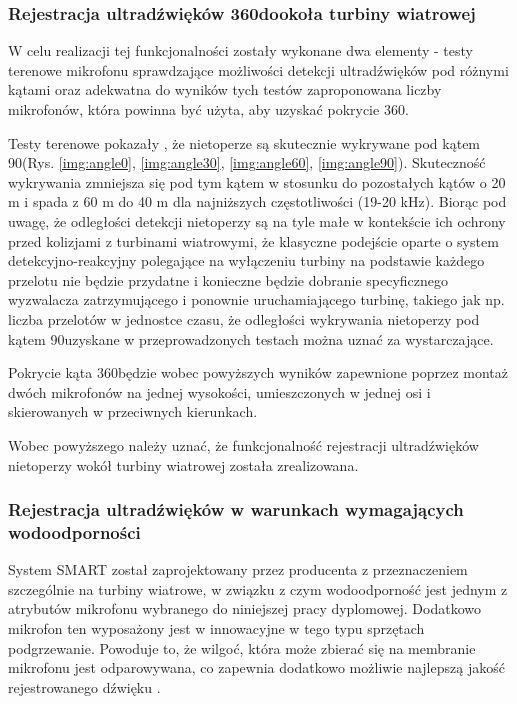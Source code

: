 \documentclass{sprz}
\begin{document}
\subsubsection{Rejestracja ultradźwięków 360\textdegree dookoła turbiny wiatrowej}
W celu realizacji tej funkcjonalności zostały wykonane dwa elementy - testy terenowe mikrofonu sprawdzające możliwości detekcji ultradźwięków pod różnymi kątami oraz adekwatna do wyników tych testów zaproponowana liczby mikrofonów, która powinna być użyta, aby uzyskać pokrycie 360\textdegree. 


Testy terenowe pokazały , że nietoperze są skutecznie wykrywane pod kątem 90\textdegree (Rys. \ref{img:angle0}, \ref{img:angle30}, \ref{img:angle60}, \ref{img:angle90}). Skuteczność wykrywania zmniejsza się pod tym kątem w stosunku do pozostałych kątów o 20 m i spada z 60 m do 40 m dla najniższych częstotliwości (19-20 kHz). Biorąc pod uwagę, że odległości detekcji nietoperzy są na tyle małe w kontekście ich ochrony przed kolizjami z turbinami wiatrowymi, że klasyczne podejście oparte o system detekcyjno-reakcyjny polegające
na wyłączeniu turbiny na podstawie każdego przelotu nie będzie przydatne i konieczne będzie dobranie specyficznego wyzwalacza zatrzymującego i ponownie uruchamiającego turbinę, takiego jak np. liczba przelotów w jednostce czasu, że odległości wykrywania nietoperzy pod kątem 90\textdegree uzyskane w przeprowadzonych testach można uznać za wystarczające. 

Pokrycie kąta 360\textdegree będzie wobec powyższych wyników zapewnione poprzez montaż dwóch mikrofonów na jednej wysokości, umieszczonych w jednej osi i skierowanych w przeciwnych kierunkach.

Wobec powyższego należy uznać, że funkcjonalność rejestracji ultradźwięków nietoperzy wokół turbiny wiatrowej została zrealizowana.


\subsubsection{Rejestracja ultradźwięków w warunkach wymagających wodoodporności}
System SMART został zaprojektowany przez producenta z przeznaczeniem szczególnie na turbiny wiatrowe, w związku z czym wodoodporność jest jednym z atrybutów mikrofonu wybranego do niniejszej pracy dyplomowej. Dodatkowo mikrofon ten wyposażony jest w innowacyjne w tego typu sprzętach podgrzewanie. Powoduje to, że wilgoć, która może zbierać się na membranie mikrofonu jest odparowywana, co zapewnia dodatkowo możliwie najlepszą jakość rejestrowanego dźwięku \cite{smart-user-guide}. 
\end{document}
